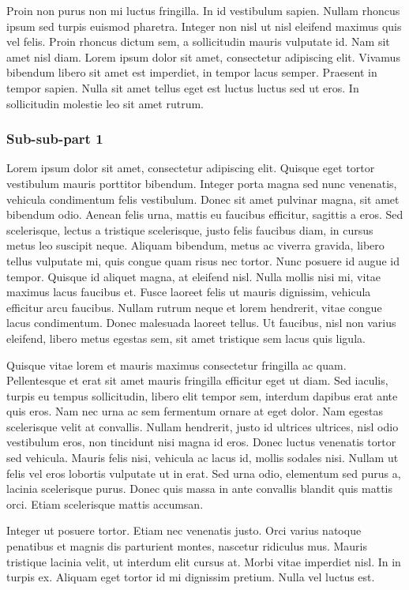 \documentclass[a4paper,15pt]{article}
\begin{document}
Proin non purus non mi luctus fringilla. In id vestibulum sapien. Nullam rhoncus ipsum sed turpis euismod pharetra. Integer non nisl ut nisl eleifend maximus quis vel felis. Proin rhoncus dictum sem, a sollicitudin mauris vulputate id. Nam sit amet nisl diam. Lorem ipsum dolor sit amet, consectetur adipiscing elit. Vivamus bibendum libero sit amet est imperdiet, in tempor lacus semper. Praesent in tempor sapien. Nulla sit amet tellus eget est luctus luctus sed ut eros. In sollicitudin molestie leo sit amet rutrum.

\subsubsection{Sub-sub-part 1}

Lorem ipsum dolor sit amet, consectetur adipiscing elit. Quisque eget tortor vestibulum mauris porttitor bibendum. Integer porta magna sed nunc venenatis, vehicula condimentum felis vestibulum. Donec sit amet pulvinar magna, sit amet bibendum odio. Aenean felis urna, mattis eu faucibus efficitur, sagittis a eros. Sed scelerisque, lectus a tristique scelerisque, justo felis faucibus diam, in cursus metus leo suscipit neque. Aliquam bibendum, metus ac viverra gravida, libero tellus vulputate mi, quis congue quam risus nec tortor. Nunc posuere id augue id tempor. Quisque id aliquet magna, at eleifend nisl. Nulla mollis nisi mi, vitae maximus lacus faucibus et. Fusce laoreet felis ut mauris dignissim, vehicula efficitur arcu faucibus. Nullam rutrum neque et lorem hendrerit, vitae congue lacus condimentum. Donec malesuada laoreet tellus. Ut faucibus, nisl non varius eleifend, libero metus egestas sem, sit amet tristique sem lacus quis ligula.

Quisque vitae lorem et mauris maximus consectetur fringilla ac quam. Pellentesque et erat sit amet mauris fringilla efficitur eget ut diam. Sed iaculis, turpis eu tempus sollicitudin, libero elit tempor sem, interdum dapibus erat ante quis eros. Nam nec urna ac sem fermentum ornare at eget dolor. Nam egestas scelerisque velit at convallis. Nullam hendrerit, justo id ultrices ultrices, nisl odio vestibulum eros, non tincidunt nisi magna id eros. Donec luctus venenatis tortor sed vehicula. Mauris felis nisi, vehicula ac lacus id, mollis sodales nisi. Nullam ut felis vel eros lobortis vulputate ut in erat. Sed urna odio, elementum sed purus a, lacinia scelerisque purus. Donec quis massa in ante convallis blandit quis mattis orci. Etiam scelerisque mattis accumsan.

Integer ut posuere tortor. Etiam nec venenatis justo. Orci varius natoque penatibus et magnis dis parturient montes, nascetur ridiculus mus. Mauris tristique lacinia velit, ut interdum elit cursus at. Morbi vitae imperdiet nisl. In in turpis ex. Aliquam eget tortor id mi dignissim pretium. Nulla vel luctus est.
\end{document}
